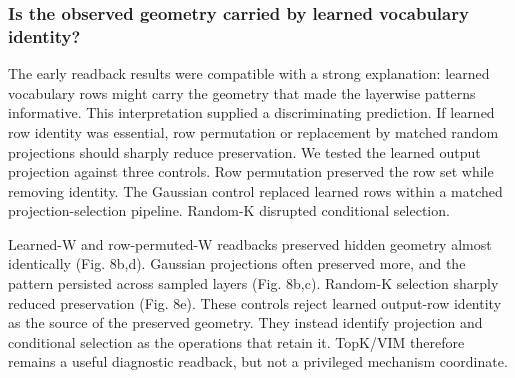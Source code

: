 \documentclass[11pt]{article}
\begin{document}
\FloatBarrier

\subsubsection*{Is the observed geometry carried by learned vocabulary identity?}
The early readback results were compatible with a strong explanation: learned vocabulary rows might carry the geometry that made the layerwise patterns informative. This interpretation supplied a discriminating prediction. If learned row identity was essential, row permutation or replacement by matched random projections should sharply reduce preservation. We tested the learned output projection against three controls. Row permutation preserved the row set while removing identity. The Gaussian control replaced learned rows within a matched projection-selection pipeline. Random-K disrupted conditional selection.

Learned-W and row-permuted-W readbacks preserved hidden geometry almost identically (Fig. 8b,d). Gaussian projections often preserved more, and the pattern persisted across sampled layers (Fig. 8b,c). Random-K selection sharply reduced preservation (Fig. 8e). These controls reject learned output-row identity as the source of the preserved geometry. They instead identify projection and conditional selection as the operations that retain it. TopK/VIM therefore remains a useful diagnostic readback, but not a privileged mechanism coordinate.
\end{document}
